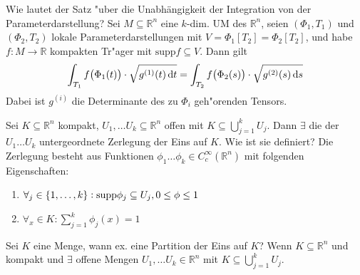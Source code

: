 \documentclass[9pt]{article}
\newenvironment{field}{}{\newpage}
\newif\ifnote
\newenvironment{note}{\notetrue}{\notefalse}
\newcommand{\localtag}{}
\newcommand{\globaltag}{}
\newcommand{\uuid}{}
\newcommand{\tags}[1]{
    \ifnote 
        \renewcommand{\localtag}{#1}
    \else
        \renewcommand{\globaltag}{#1}
    \fi 
    }
\newcommand{\xplain}[1]{\renewcommand{\uuid}{#1}}
\begin{document}
\begin{note}
	\xplain{cb0f1769-f562-4b8c-85d5-0619ccef3a5e}
	\tags{satz, integration, 1.3.7}
	\begin{field}
		Wie lautet der Satz "uber die Unabhängigkeit der Integration von der Parameterdarstellung?  
	\end{field}
	\begin{field}
		Sei $M \subseteq \mathbb{R}^n$ eine $k$-dim. UM des $\mathbb{R}^n$, seien $(\Phi_1, T_1)$ und $(\Phi_2, T_2)$ 
		lokale Parameterdarstellungen mit $V=\Phi_1[T_2] = \Phi_2[T_2]$, und habe $f: M \rightarrow \mathbb{R}$ kompakten Tr"ager mit $\text{supp}f \subseteq V$.
		Dann gilt
		\begin{equation*}
		\int_{T_1}f\qty(\Phi_1(t)) \cdot \sqrt{g^{(1)}(t)\dif t}=
		\int_{T_2}f\qty(\Phi_2(s)) \cdot \sqrt{g^{(2)}(s)\dif s}
		\end{equation*} 
		Dabei ist $g^{(i)}$ die Determinante des zu $\Phi_i$ geh"orenden Tensors.
	\end{field}
\end{note}

\begin{note}
	\xplain{0691abde-07a7-4d93-acc6-3c22092196b7}
	\tags{definition, satz , 1.3.8, 1.3.9}
	\begin{field}
		Sei $K\subseteq \mathbb{R}^n$ kompakt, $U_1,\dots U_k \subseteq \mathbb{R}^n$ offen mit $K \subseteq \bigcup^k_{j=1} U_j$. Dann $\exists$ die der $U_1 \dots U_k$ untergeordnete Zerlegung der Eins auf $K$. 
		Wie ist sie definiert?
	\end{field}
	\begin{field}
		Die Zerlegung besteht aus Funktionen $\phi_1 \dots \phi_k \in C^\infty_c(\mathbb{R}^n)$ mit folgenden Eigenschaften:
		\begin{enumerate}
			\item $\forall_j \in \qty{1,\dots,k}: \text{supp}\phi_j \subseteq U_j, 0 \leq \phi \leq 1$
			\item $\forall_x \in K: \sum_{j=1}^k \phi_j(x) = 1$
		\end{enumerate}
	\end{field}
	\begin{field}
		Sei $K$ eine Menge, wann ex. eine Partition der Eins auf $K$?
	\end{field}
	\begin{field}
		Wenn $K \subseteq \mathbb{R}^n$ und kompakt und $\exists $ offene Mengen $U_1, \dots U_k \in \mathbb{R}^n$ mit $K \subseteq \bigcup^k_{j=1} U_j$. 
	\end{field}
\end{note}
\end{document}
